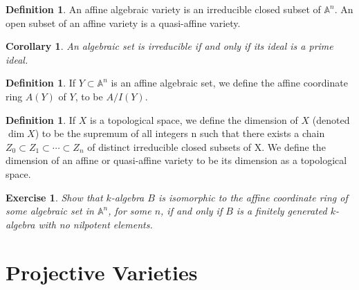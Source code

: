 \documentclass[11pt]{book}
\newtheorem{corollary}[theorem]{Corollary}
\newtheorem{exercise}{Exercise}[section]
\theoremstyle{definition}
\newtheorem{definition}[theorem]{Definition}
\numberwithin{equation}{section}
\begin{document}
\begin{defbox}
    \begin{definition}
        \label{def:algebraic_variety}
        An affine algebraic variety is an irreducible closed subset of \(\mathbb{A}^n\). An open subset of an affine variety is a quasi-affine variety.
    \end{definition}
\end{defbox}

\begin{thmbox}
\begin{corollary}
    \label{cor:ideal_correspondence}
    An algebraic set is irreducible if and only if its ideal is a prime ideal.
\end{corollary}
\end{thmbox}

\begin{defbox}
    \begin{definition}
        \label{def:affine_coordinate_ring}
        If \(Y \subset \mathbb{A}^n\) is an affine algebraic set, we define the affine coordinate ring \(A(Y)\) of \(Y\), to be \(A / I(Y)\). 
    \end{definition}
\end{defbox}

\begin{defbox}
    \begin{definition}
        \label{def:dimension_topological_space}
        If \(X\) is a topological space, we define the dimension of \(X\) (denoted
        \(\dim  X\)) to be the supremum of all integers n such that there exists a chain \(Z_0 \subset Z_1 \subset \cdots \subset Z_n\) of distinct irreducible closed subsets of X. We define the dimension of an affine or quasi-affine variety to be its dimension as a topological space. 
    \end{definition}
\end{defbox}

% 

\begin{exercise}
Show that \(k\)-algebra \(B\) is isomorphic to the affine coordinate ring of some algebraic set in \(\mathbb{A}^n\), for some \(n\), if and only if \(B\) is a finitely generated \(k\)-algebra with no nilpotent elements.
\end{exercise}

\chapter{Projective Varieties}
\end{document}
